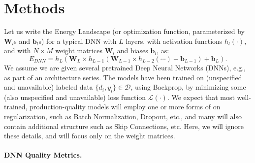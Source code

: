 \section{Methods}
\label{sxn:methods}


Let us write the Energy Landscape (or optimization function, parameterized by $\mathbf{W}_{l}$s and $\mathbf{b}_{l}$s) for a typical DNN with $L$ layers, with activation functions $h_{l}(\cdot)$, and with $N\times M$ weight matrices $\mathbf{W}_{l}$ and biases $\mathbf{b}_{l}$, as:
\begin{equation}
E_{DNN}=h_{L}(\mathbf{W}_{L}\times h_{L-1}(\mathbf{W}_{L-1}\times h_{L-2}(\cdots)+\mathbf{b}_{L-1})+\mathbf{b}_{L})  .
\label{eqn:dnn_energy}
\end{equation}
We assume we are given several pretrained Deep Neural Networks (DNNs), e.g., as part of an architecture series.
The models have been trained on (unspecified and unavailable) labeled data $\{d_{i},y_{i}\}\in\mathcal{D}$, using Backprop, by minimizing some (also unspecified and unavailable) loss function $\mathcal{L}(\cdot)$. 
We expect that most well-trained, production-quality models will employ one or more forms of on regularization, such as Batch Normalization, Dropout, etc., and many will also contain additional structure such as Skip Connections, etc. 
Here, we will ignore these details, and will focus only on the weight matrices. 


\paragraph{DNN Quality Metrics.}

